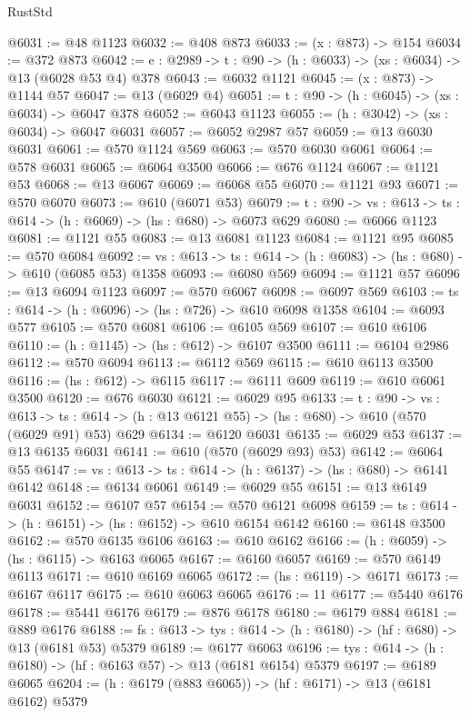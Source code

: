 \begin{lexlean}{RustStd}
\begin{coremodule}
@6031 := @48 @1123
@6032 := @408 @873
@6033 := (x : @873) -> @154
@6034 := @372 @873
@6042 := {e : @2989} -> {t : @90} -> (h : @6033) -> (xs : @6034) -> @13 (@6028 @53 @4) @378
@6043 := @6032 @1121
@6045 := (x : @873) -> @1144 @57
@6047 := @13 (@6029 @4)
@6051 := {t : @90} -> (h : @6045) -> (xs : @6034) -> @6047 @378
@6052 := @6043 @1123
@6055 := (h : @3042) -> (xs : @6034) -> @6047 @6031
@6057 := @6052 @2987 @57
@6059 := @13 @6030 @6031
@6061 := @570 @1124 @569
@6063 := @570 @6030 @6061
@6064 := @578 @6031
@6065 := @6064 @3500
@6066 := @676 @1124
@6067 := @1121 @53
@6068 := @13 @6067
@6069 := @6068 @55
@6070 := @1121 @93
@6071 := @570 @6070
@6073 := @610 (@6071 @53)
@6079 := {t : @90} -> {vs : @613} -> {ts : @614} -> (h : @6069) -> (hs : @680) -> @6073 @629
@6080 := @6066 @1123
@6081 := @1121 @55
@6083 := @13 @6081 @1123
@6084 := @1121 @95
@6085 := @570 @6084
@6092 := {vs : @613} -> {ts : @614} -> (h : @6083) -> (hs : @680) -> @610 (@6085 @53) @1358
@6093 := @6080 @569
@6094 := @1121 @57
@6096 := @13 @6094 @1123
@6097 := @570 @6067
@6098 := @6097 @569
@6103 := {ts : @614} -> (h : @6096) -> (hs : @726) -> @610 @6098 @1358
@6104 := @6093 @577
@6105 := @570 @6081
@6106 := @6105 @569
@6107 := @610 @6106
@6110 := (h : @1145) -> (hs : @612) -> @6107 @3500
@6111 := @6104 @2986
@6112 := @570 @6094
@6113 := @6112 @569
@6115 := @610 @6113 @3500
@6116 := (hs : @612) -> @6115
@6117 := @6111 @609
@6119 := @610 @6061 @3500
@6120 := @676 @6030
@6121 := @6029 @95
@6133 := {t : @90} ->
  {vs : @613} ->
  {ts : @614} -> (h : @13 @6121 @55) -> (hs : @680) -> @610 (@570 (@6029 @91) @53) @629
@6134 := @6120 @6031
@6135 := @6029 @53
@6137 := @13 @6135 @6031
@6141 := @610 (@570 (@6029 @93) @53)
@6142 := @6064 @55
@6147 := {vs : @613} -> {ts : @614} -> (h : @6137) -> (hs : @680) -> @6141 @6142
@6148 := @6134 @6061
@6149 := @6029 @55
@6151 := @13 @6149 @6031
@6152 := @6107 @57
@6154 := @570 @6121 @6098
@6159 := {ts : @614} -> (h : @6151) -> (hs : @6152) -> @610 @6154 @6142
@6160 := @6148 @3500
@6162 := @570 @6135 @6106
@6163 := @610 @6162
@6166 := (h : @6059) -> (hs : @6115) -> @6163 @6065
@6167 := @6160 @6057
@6169 := @570 @6149 @6113
@6171 := @610 @6169 @6065
@6172 := (hs : @6119) -> @6171
@6173 := @6167 @6117
@6175 := @610 @6063 @6065
@6176 := 11
@6177 := @5440 @6176
@6178 := @5441 @6176
@6179 := @876 @6178
@6180 := @6179 @884
@6181 := @889 @6176
@6188 := {fs : @613} -> {tys : @614} -> (h : @6180) -> (hf : @680) -> @13 (@6181 @53) @5379
@6189 := @6177 @6063
@6196 := {tys : @614} -> (h : @6180) -> (hf : @6163 @57) -> @13 (@6181 @6154) @5379
@6197 := @6189 @6065
@6204 := (h : @6179 (@883 @6065)) -> (hf : @6171) -> @13 (@6181 @6162) @5379

\end{coremodule}
\end{lexlean}
